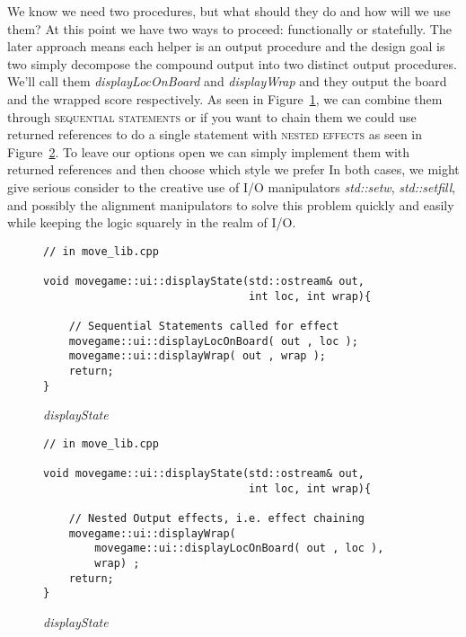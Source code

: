 \documentclass[nobib]{tufte-handout}
\begin{document}
We know we need two procedures, but what should they do and how will we use them?  At this point we have two ways to proceed: functionally or statefully. The later approach means each helper is an output procedure and the design goal is two simply decompose the compound output into two distinct output procedures. We'll call them \textit{displayLocOnBoard} and \textit{displayWrap} and they output the board and the wrapped score respectively. As seen in Figure~\ref{fig:display-twoOut}, we can combine them through \textsc{sequential statements} or if you want to chain them we could use returned references to do a single statement with \textsc{nested effects} as seen in Figure~\ref{fig:display-twoOut-chained}. To leave our options open we can simply implement them with returned references and then choose which style we prefer In both cases, we might give serious consider to the creative use of I/O manipulators \textit{std::setw}, \textit{std::setfill}, and possibly the alignment manipulators to solve this problem quickly and easily while keeping the logic squarely in the realm of I/O.

\begin{figure}[!htbp]
\begin{lstlisting}
// in move_lib.cpp

void movegame::ui::displayState(std::ostream& out,
	                            int loc, int wrap){

	// Sequential Statements called for effect
	movegame::ui::displayLocOnBoard( out , loc );
	movegame::ui::displayWrap( out , wrap );
	return;
}

\end{lstlisting}
\caption{\textit{displayState} }
\label{fig:display-twoOut}
\end{figure}

\begin{figure}[!htbp]
\begin{lstlisting}
// in move_lib.cpp

void movegame::ui::displayState(std::ostream& out,
	                            int loc, int wrap){

	// Nested Output effects, i.e. effect chaining
	movegame::ui::displayWrap(
		movegame::ui::displayLocOnBoard( out , loc ),
		wrap) ;
	return;
}

\end{lstlisting}
\caption{\textit{displayState} }
\label{fig:display-twoOut-chained}
\end{figure}
\end{document}
